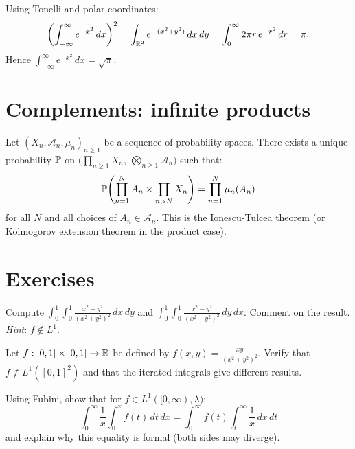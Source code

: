 \begin{example}
Using Tonelli and polar coordinates:
\[
    \left(\int_{-\infty}^{\infty} e^{-x^2}\, dx\right)^2
    = \int_{\mathbb{R}^2} e^{-(x^2+y^2)}\, dx\, dy
    = \int_0^{\infty} 2\pi r\, e^{-r^2}\, dr = \pi.
\]
Hence $\int_{-\infty}^{\infty} e^{-x^2}\, dx = \sqrt{\pi}$.
\end{example}

\section{Complements: infinite products}

\begin{theorem}
Let $(X_n, \mathcal{A}_n, \mu_n)_{n \geq 1}$ be a sequence of probability spaces.
There exists a unique probability $\mathbb{P}$ on
$\bigl(\prod_{n \geq 1} X_n,\, \bigotimes_{n \geq 1} \mathcal{A}_n\bigr)$ such that:
\[
    \mathbb{P}\!\left(\prod_{n=1}^{N} A_n \times \prod_{n > N} X_n\right)
    = \prod_{n=1}^{N} \mu_n(A_n)
\]
for all $N$ and all choices of $A_n \in \mathcal{A}_n$. This is the
Ionescu-Tulcea theorem (or Kolmogorov extension theorem in the product case).
\end{theorem}

\section{Exercises}

\begin{exercise}
Compute $\int_0^1 \int_0^1 \frac{x^2 - y^2}{(x^2 + y^2)^2}\, dx\, dy$ and
$\int_0^1 \int_0^1 \frac{x^2 - y^2}{(x^2 + y^2)^2}\, dy\, dx$. Comment on
the result. \emph{Hint}: $f \notin L^1$.
\end{exercise}

\begin{exercise}
Let $f : [0,1] \times [0,1] \to \mathbb{R}$ be defined by $f(x,y) = \frac{xy}{(x^2+y^2)^2}$.
Verify that $f \notin L^1([0,1]^2)$ and that the iterated integrals give different
results.
\end{exercise}

\begin{exercise}
Using Fubini, show that for $f \in L^1([0,\infty), \lambda)$:
\[
    \int_0^{\infty} \frac{1}{x} \int_0^x f(t)\, dt\, dx
    = \int_0^{\infty} f(t) \int_t^{\infty} \frac{1}{x}\, dx\, dt
\]
and explain why this equality is formal (both sides may diverge).
\end{exercise}

